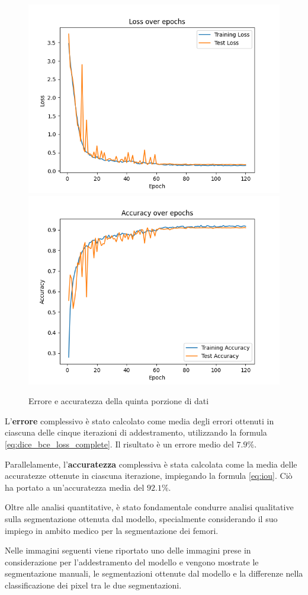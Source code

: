 \begin{figure}
	\centering
	\includegraphics[width=0.4\columnwidth]{Immagini/fold_4_loss.png} \includegraphics[width=0.4\columnwidth]{Immagini/fold_4_accuracy.png}
	\caption{Errore e accuratezza della quinta porzione di dati}
	\label{fig:loss e accuratezza della quinta porzione di dati}
\end{figure}


L'\textbf{errore} complessivo è stato calcolato come media degli errori ottenuti in ciascuna delle
cinque iterazioni di addestramento, utilizzando la formula \ref{eq:dice_bce_loss_complete}. Il
risultato è un errore medio del \textbf{$7.9\%$}.

Parallelamente, l'\textbf{accuratezza} complessiva è stata calcolata come la media delle accuratezze
ottenute in ciascuna iterazione, impiegando la formula \ref{eq:iou}. Ciò ha portato a un'accuratezza
media del \textbf{$92.1\%$}.

Oltre alle analisi quantitative, è stato fondamentale condurre analisi qualitative sulla
segmentazione ottenuta dal modello, specialmente considerando il suo impiego in ambito medico per la
segmentazione dei femori.

Nelle immagini seguenti viene riportato uno delle immagini prese in considerazione per
l'addestramento del modello e vengono mostrate le segmentazione manuali, le segmentazioni ottenute
dal modello e la differenze nella classificazione dei pixel tra le due segmentazioni.


